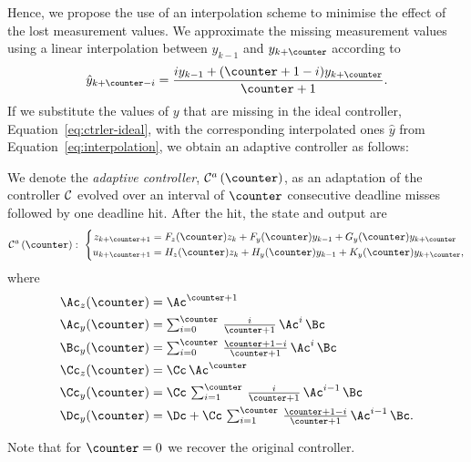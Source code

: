 Hence, we propose the use of an interpolation scheme to minimise the effect of the lost measurement values.
We approximate the missing measurement values using a linear interpolation between $y_{k-1}$ and $y_{k+\counter}$ according to
%
\begin{equation}
    \label{eq:interpolation}
    \hat y_{k+\counter-i} = \frac{i y_{k-1} + (\counter+1-i) y_{k+\counter}}{\counter+1} .
\end{equation}
%
If we substitute the values of $y$ that are missing in the ideal controller, Equation~\eqref{eq:ctrler-ideal}, with the corresponding interpolated ones $\hat y$ from Equation~\eqref{eq:interpolation}, we obtain an adaptive controller as follows:

\begin{definition}%
    We denote the \emph{adaptive controller}, $\ctrler^a\funof{\counter}$, as an adaptation of the controller $\mathcal{C}$ evolved over an interval of $\counter$ consecutive deadline misses followed by one deadline hit.
    After the hit, the state and output are
    \begin{equation}
        \label{eq:adaptive}
           \ctrler^a\funof{\counter}: \,\,
            \left\{
            \begin{aligned}
                z_{k+\counter+1} &= F_z(\counter) z_{k} +  F_y(\counter) y_{k-1} + G_y(\counter) y_{k+\counter} \\
                u_{k+\counter+1} &= H_z(\counter) z_{k} + H_y(\counter) y_{k-1} + K_y(\counter) y_{k+\counter},
            \end{aligned}\right.
    \end{equation}
    where
    \begin{equation*}
        \begin{aligned}
         \Ac_z(\counter) &= \Ac^{\counter+1} \\
         \Ac_y(\counter) &= \textstyle\sum\nolimits_{i=0}^{\counter}\, \tfrac{i}{\counter+1}\, \Ac^{i}\, \Bc \\
         \Bc_y(\counter) &= \textstyle\sum\nolimits_{i=0}^{\counter}\, \tfrac{\counter+1-i}{\counter+1}\, \Ac^{i}\, \Bc \\
         \Cc_z(\counter) &= \Cc\, \Ac^\counter \\
         \Cc_y(\counter) &= \Cc\, \textstyle\sum\nolimits_{i=1}^{\counter}\, \tfrac{i}{\counter+1}\, \Ac^{i-1}\, \Bc \\
         \Dc_y(\counter) &= \Dc + \Cc\, \textstyle\sum\nolimits_{i=1}^{\counter}\, \tfrac{\counter+1-i}{\counter+1}\, \Ac^{i-1}\, \Bc.
         \end{aligned}
    \end{equation*}
\end{definition}
Note that for $\counter = 0$ we recover the original controller.

